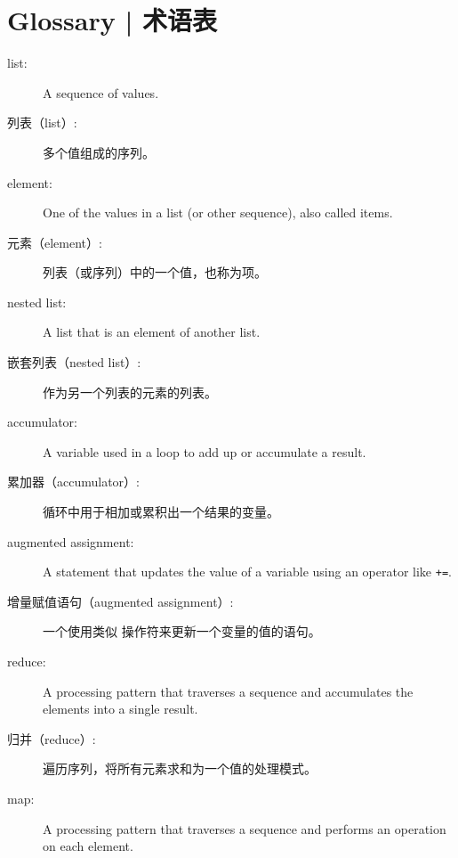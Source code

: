 \section{Glossary  |  术语表}

\begin{description}

\item[list:] A sequence of values.

\item[列表（list）:] 多个值组成的序列。

\item[element:] One of the values in a list (or other sequence),
also called items.

\item[元素（element）:] 列表（或序列）中的一个值，也称为项。

\item[nested list:] A list that is an element of another list.

\item[嵌套列表（nested list）:] 作为另一个列表的元素的列表。

\item[accumulator:] A variable used in a loop to add up or
accumulate a result.

\item[累加器（accumulator）:] 循环中用于相加或累积出一个结果的变量。

\item[augmented assignment:] A statement that updates the value
of a variable using an operator like \verb"+=".
  

\item[增量赋值语句（augmented assignment）:] 一个使用类似 \li{+=} 操作符来更新一个变量的值的语句。
  

\item[reduce:] A processing pattern that traverses a sequence
and accumulates the elements into a single result.
  

\item[归并（reduce）:] 遍历序列，将所有元素求和为一个值的处理模式。
  

\item[map:] A processing pattern that traverses a sequence and
performs an operation on each element.
  


\end{description}
